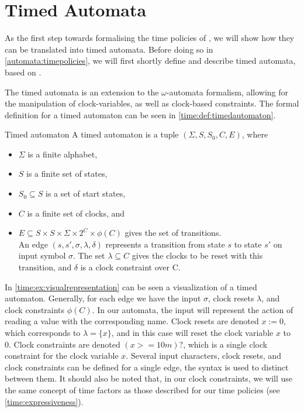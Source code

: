 
\section{Timed Automata}\label{automata}
As the first step towards formalising the time policies of \thelang, we will show how they can be translated into timed automata.
Before doing so in \cref{automata:timepolicies}, we will first shortly define and describe timed automata, based on \cite{alur1994theory}.

The timed automata is an extension to the $\omega$-automata formalism, allowing for the manipulation of clock-variables, as well as clock-based constraints.
The formal definition for a timed automaton can be seen in \cref{time:def:timedautomaton}.

\begin{definition}{Timed automaton}\label{time:def:timedautomaton}
A timed automaton is a tuple $(\Sigma, S, S_0, C, E)$, where
\begin{itemize}
  \item $\Sigma$ is a finite alphabet,
  \item $S$ is a finite set of states,
  \item $S_0 \subseteq S$ is a set of start states,
  \item $C$ is a finite set of clocks, and
  \item $E \subseteq S \times S \times \Sigma \times 2^C \times \phi(C)$ gives the set of transitions. \\
    An edge $(s, s', \sigma, \lambda, \delta)$ represents a transition from state $s$ to state $s'$ on input symbol $\sigma$.
    The set $\lambda \subseteq C$ gives the clocks to be reset with this transition, and $\delta$ is a clock constraint over C.
\end{itemize}
\end{definition}

In \cref{time:ex:visualrepresentation} can be seen a visualization of a timed automaton.
Generally, for each edge we have the input $\sigma$, clock resets $\lambda$, and clock constraints $\phi(C)$.
In our automata, the input will represent the action of reading a value with the corresponding name.
Clock resets are denoted $x := 0$, which corresponds to $\lambda = \{ x \}$, and in this case will reset the clock variable $x$ to 0.
Clock constraints are denoted $(x >= 10m)?$, which is a single clock constraint for the clock variable $x$.
Several input characters, clock resets, and clock constraints can be defined for a single edge, the syntax is used to distinct between them.
It should also be noted that, in our clock constraints, we will use the same concept of time factors as those described for our time policies (see \cref{time:expressiveness}).

